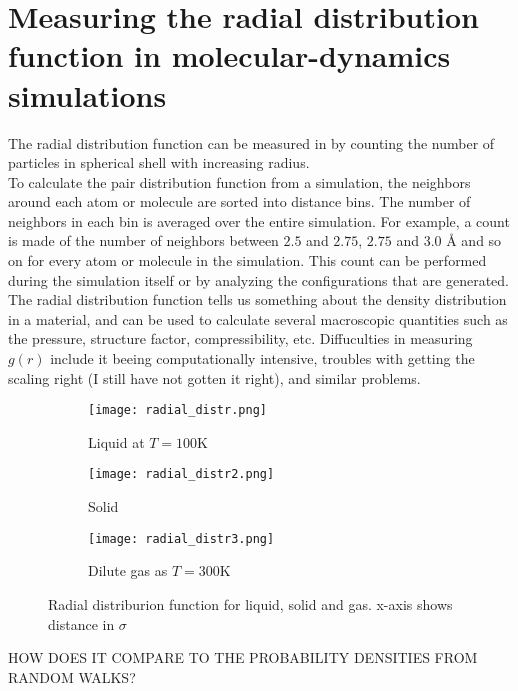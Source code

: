 \documentclass[a4paper,english, 10pt, twoside]{article}
\begin{document}
\section{Measuring the radial distribution function in molecular-dynamics simulations}
The radial distribution function can be measured in by counting the number of particles in spherical shell with 
increasing radius. \\
To calculate the pair distribution function from a simulation, the neighbors around each atom or molecule are sorted 
into distance bins. The number of neighbors in each bin is averaged over the entire simulation. For example, a count 
is made of the number of neighbors between $2.5$ and $2.75$, $2.75$ and $3.0$ Å and so on for every atom or molecule 
in the simulation. This count can be performed during the simulation itself or by analyzing the configurations that 
are generated. \\
The radial distribution function tells us something about the density distribution in a material, and can be used to 
calculate several macroscopic quantities such as the pressure, structure factor, compressibility, etc.
Diffuculties in measuring $g(r)$ include it beeing computationally intensive, troubles with getting the scaling right 
(I still have not gotten it right), and similar problems.
\begin{figure}[H]
\centering
\begin{subfigure}[b]{0.3\textwidth}
    \texttt{[image: radial\_distr.png]}
    \caption{Liquid at $T=100$K}
    \label{g(r):liquid} 
\end{subfigure}
\begin{subfigure}[b]{0.3\textwidth}
    \texttt{[image: radial\_distr2.png]}
    \caption{Solid}
    \label{g(r):solid} 
\end{subfigure}
\begin{subfigure}[b]{0.3\textwidth}
    \texttt{[image: radial\_distr3.png]}
    \caption{Dilute gas as $T=300$K}
    \label{g(r):gas} 
\end{subfigure}
\caption{Radial distriburion function for liquid, solid and gas. x-axis shows distance in $\sigma$}
\label{g(r)}
\end{figure}
HOW DOES IT COMPARE TO THE PROBABILITY DENSITIES FROM RANDOM WALKS?
\end{document}

